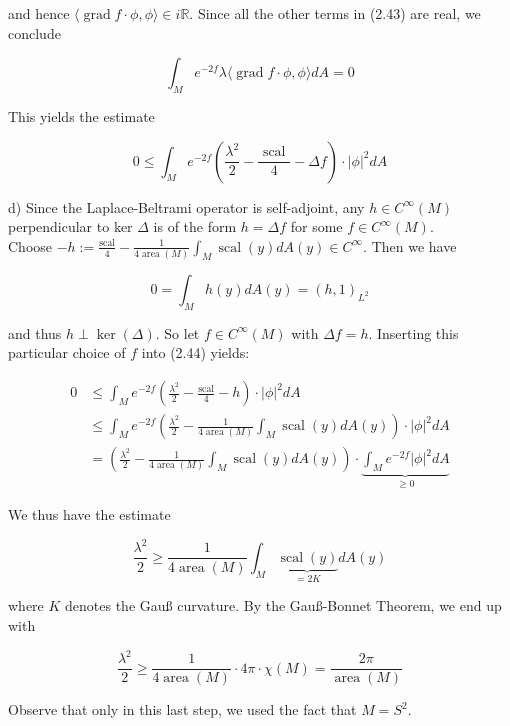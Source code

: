 \documentclass[10pt, letterpaper]{article}
\begin{document}
and hence $\langle\operatorname{grad} f \cdot \phi, \phi\rangle \in i \mathbb{R}$. Since all the other terms in (2.43) are real, we conclude

$$
\int_{M} e^{-2 f} \lambda\langle\operatorname{grad} f \cdot \phi, \phi\rangle d A=0
$$

This yields the estimate

$$
0 \leq \int_{M} e^{-2 f}\left(\frac{\lambda^{2}}{2}-\frac{\text { scal }}{4}-\Delta f\right) \cdot|\phi|^{2} d A
$$

d) Since the Laplace-Beltrami operator is self-adjoint, any $h \in C^{\infty}(M)$ perpendicular to ker $\Delta$ is of the form $h=\Delta f$ for some $f \in C^{\infty}(M)$.\\
Choose $-h:=\frac{\mathrm{scal}}{4}-\frac{1}{4 \operatorname{area}(M)} \int_{M} \operatorname{scal}(y) d A(y) \in C^{\infty}$. Then we have

$$
0=\int_{M} h(y) d A(y)=(h, 1)_{L^{2}}
$$

and thus $h \perp \operatorname{ker}(\Delta)$. So let $f \in C^{\infty}(M)$ with $\Delta f=h$. Inserting this particular choice of $f$ into (2.44) yields:

$$
\begin{aligned}
0 & \leq \int_{M} e^{-2 f}\left(\frac{\lambda^{2}}{2}-\frac{\mathrm{scal}}{4}-h\right) \cdot|\phi|^{2} d A \\
& \leq \int_{M} e^{-2 f}\left(\frac{\lambda^{2}}{2}-\frac{1}{4 \operatorname{area}(M)} \int_{M} \operatorname{scal}(y) d A(y)\right) \cdot|\phi|^{2} d A \\
& =\left(\frac{\lambda^{2}}{2}-\frac{1}{4 \operatorname{area}(M)} \int_{M} \operatorname{scal}(y) d A(y)\right) \cdot \underbrace{\int_{M} e^{-2 f}|\phi|^{2} d A}_{\geq 0}
\end{aligned}
$$

We thus have the estimate

$$
\frac{\lambda^{2}}{2} \geq \frac{1}{4 \operatorname{area}(M)} \int_{M} \underbrace{\operatorname{scal}(y)}_{=2 K} d A(y)
$$

where $K$ denotes the Gauß curvature. By the Gauß-Bonnet Theorem, we end up with

$$
\frac{\lambda^{2}}{2} \geq \frac{1}{4 \operatorname{area}(M)} \cdot 4 \pi \cdot \chi(M)=\frac{2 \pi}{\operatorname{area}(M)}
$$

Observe that only in this last step, we used the fact that $M=S^{2}$.



\pagebreak
\end{document}
